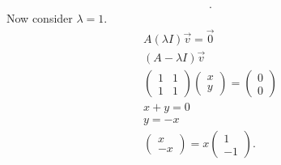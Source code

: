 \begin{eg}
\begin{align*}
  .\end{align*}
  Now consider $\lambda = 1$.
  \begin{align*}
    A(\lambda I)\vec{v}=\vec{0}\\
    (A-\lambda I)\vec{v}\\
    \begin{pmatrix} 1&1\\1&1 \end{pmatrix} \begin{pmatrix} x\\y \end{pmatrix} =\begin{pmatrix} 0\\0 \end{pmatrix} \\
    x+y=0\\
    y=-x\\
    \begin{pmatrix} x\\-x \end{pmatrix} =x\begin{pmatrix} 1\\-1 \end{pmatrix} 
  .\end{align*}
\end{eg}

